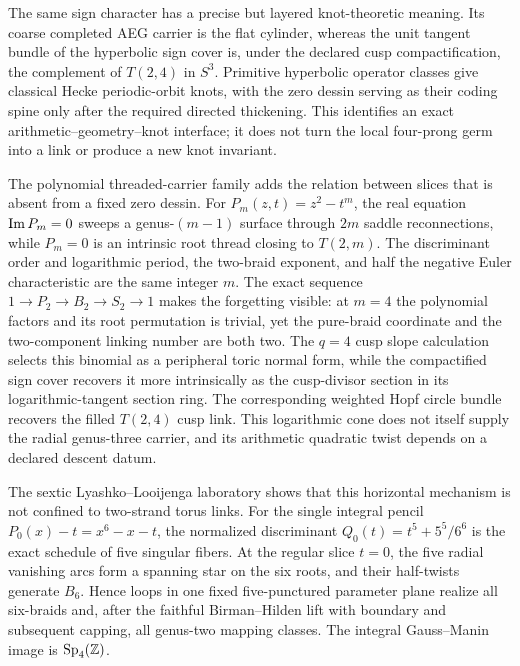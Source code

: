 The same sign character has a precise but layered knot-theoretic meaning.  Its
coarse completed AEG carrier is the flat cylinder, whereas the unit tangent bundle
of the hyperbolic sign cover is, under the declared cusp compactification, the
complement of $T(2,4)$ in $S^3$.  Primitive hyperbolic operator classes give
classical Hecke periodic-orbit knots, with the zero dessin serving as their coding
spine only after the required directed thickening.  This identifies an exact
arithmetic--geometry--knot interface; it does not turn the local four-prong germ
into a link or produce a new knot invariant.

The polynomial threaded-carrier family adds the relation between slices that is
absent from a fixed zero dessin.  For $P_m(z,t)=z^2-t^m$, the real equation
$\operatorname{Im} P_m=0$ sweeps a genus-$(m-1)$ surface through $2m$ saddle
reconnections, while $P_m=0$ is an intrinsic root thread closing to $T(2,m)$.
The discriminant order and logarithmic period, the two-braid exponent, and half
the negative Euler characteristic are the same integer $m$.  The exact sequence
$1\to P_2\to B_2\to S_2\to1$ makes the forgetting visible: at $m=4$ the
polynomial factors and its root permutation is trivial, yet the pure-braid
coordinate and the two-component linking number are both two.  The $q=4$ cusp
slope calculation selects this binomial as a peripheral toric normal form, while
the compactified sign cover recovers it more intrinsically as the cusp-divisor
section in its logarithmic-tangent section ring.  The corresponding weighted
Hopf circle bundle recovers the filled $T(2,4)$ cusp link.  This logarithmic cone
does not itself supply the radial genus-three carrier, and its arithmetic
quadratic twist depends on a declared descent datum.

The sextic Lyashko--Looijenga laboratory shows that this horizontal mechanism
is not confined to two-strand torus links.  For the single integral pencil
$P_0(x)-t=x^6-x-t$, the normalized discriminant
$Q_0(t)=t^5+5^5/6^6$ is the exact schedule of five singular fibers.  At the
regular slice $t=0$, the five radial vanishing arcs form a spanning star on the
six roots, and their half-twists generate $B_6$.  Hence loops in one fixed
five-punctured parameter plane realize all six-braids and, after the faithful
Birman--Hilden lift with boundary and subsequent capping, all genus-two mapping
classes.  The integral Gauss--Manin image is $\operatorname{Sp}_4(\mathbb{Z})$.

